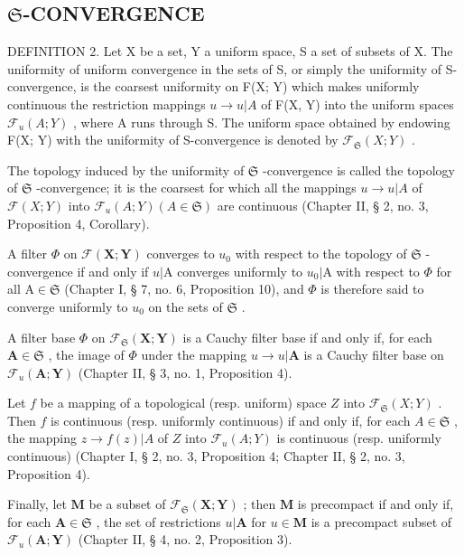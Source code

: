 \subsection{\texorpdfstring{\(\mathfrak{S}\)-CONVERGENCE}{S-CONVERGENCE}}

DEFINITION 2. Let X be a set, Y a uniform space, S a set of subsets of X. The uniformity of uniform convergence in the sets of S, or simply the uniformity of S-convergence, is the coarsest uniformity on F(X; Y) which makes uniformly continuous the restriction mappings \(u \to u|A\) of F(X, Y) into the uniform spaces \(\mathcal{F}_u(A; Y)\) , where A runs through S. The uniform space obtained by endowing F(X; Y) with the uniformity of S-convergence is denoted by \(\mathcal{F}_{\mathfrak{S}}(X; Y)\) .

The topology induced by the uniformity of \(\mathfrak{S}\) -convergence is called the topology of \(\mathfrak{S}\) -convergence; it is the coarsest for which all the mappings \(u \to u|A\) of \(\mathcal{F}(X; Y)\) into \(\mathcal{F}_u(A; Y) (A \in \mathfrak{S})\) are continuous (Chapter II, § 2, no. 3, Proposition 4, Corollary).

A filter \(\Phi\) on \(\mathcal{F}(\mathbf{X};\mathbf{Y})\) converges to \(u_{0}\) with respect to the topology of \(\mathfrak{S}\) -convergence if and only if \(u|\mathrm{A}\) converges uniformly to \(u_{0}|\mathrm{A}\) with respect to \(\Phi\) for all \(\mathrm{A}\in \mathfrak{S}\) (Chapter I, § 7, no. 6, Proposition 10), and \(\Phi\) is therefore said to converge uniformly to \(u_{0}\) on the sets of \(\mathfrak{S}\) .

A filter base \(\Phi\) on \(\mathcal{F}_{\mathfrak{S}}(\mathbf{X};\mathbf{Y})\) is a Cauchy filter base if and only if, for each \(\mathbf{A}\in\mathfrak{S}\) , the image of \(\Phi\) under the mapping \(u\to u|\mathbf{A}\) is a Cauchy filter base on \(\mathcal{F}_{u}(\mathbf{A};\mathbf{Y})\) (Chapter II, § 3, no. 1, Proposition 4).

Let \(f\) be a mapping of a topological (resp. uniform) space \(Z\) into \(\mathcal{F}_{\mathfrak{S}}(X; Y)\) . Then \(f\) is continuous (resp. uniformly continuous) if and only if, for each \(A \in \mathfrak{S}\) , the mapping \(z \to f(z)|A\) of \(Z\) into \(\mathcal{F}_u(A; Y)\) is continuous (resp. uniformly continuous) (Chapter I, § 2, no. 3, Proposition 4; Chapter II, § 2, no. 3, Proposition 4).

Finally, let \(\mathbf{M}\) be a subset of \(\mathcal{F}_{\mathfrak{S}}(\mathbf{X};\mathbf{Y})\) ; then \(\mathbf{M}\) is precompact if and only if, for each \(\mathbf{A} \in \mathfrak{S}\) , the set of restrictions \(u|\mathbf{A}\) for \(u \in \mathbf{M}\) is a precompact subset of \(\mathcal{F}_u(\mathbf{A};\mathbf{Y})\) (Chapter II, § 4, no. 2, Proposition 3).

